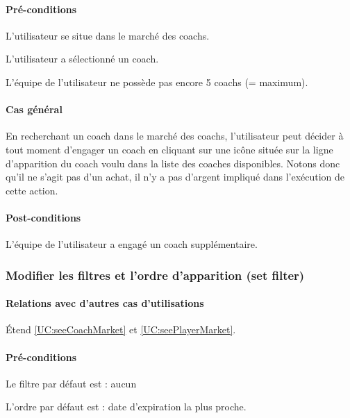 \paragraph{Pré-conditions}
\begin{list}{}{\leftmargin=1.5em}
\item{L'utilisateur se situe dans le marché des coachs.}
\item{L'utilisateur a sélectionné un coach.}
\item{L'équipe de l'utilisateur ne possède pas encore 5 coachs (= maximum).}
\end{list}
\paragraph{Cas général}
En recherchant un coach dans le marché des coachs, l'utilisateur peut décider à tout moment d'engager un coach en cliquant sur une icône située sur la ligne d'apparition du coach voulu dans la liste des coaches disponibles. Notons donc qu'il ne s'agit pas d'un achat, il n'y a pas d'argent impliqué dans l'exécution de cette action. 
\paragraph{Post-conditions}
\begin{list}{}{\leftmargin=1.5em}
\item{L'équipe de l'utilisateur a engagé un coach supplémentaire.}
\end{list}

\subsubsection{Modifier les filtres et l'ordre d'apparition (set filter)}
\label{UC:setFilter}
\paragraph{Relations avec d'autres cas d'utilisations}
Étend \ref{UC:seeCoachMarket} et \ref{UC:seePlayerMarket}.
\paragraph{Pré-conditions}
\begin{list}{}{\leftmargin=1.5em}
\item{Le filtre par défaut est : aucun}
\item{L'ordre par défaut est : date d'expiration la plus proche.}
\end{list}
